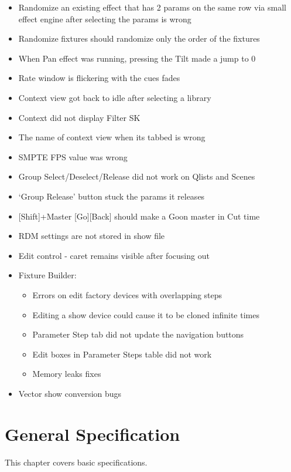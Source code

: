 \documentclass[
]{article}
\begin{document}
\begin{itemize}
\item
  Randomize an existing effect that has 2 params on the same row via small effect engine after selecting the params is wrong
\item
  Randomize fixtures should randomize only the order of the fixtures
\item
  When Pan effect was running, pressing the Tilt made a jump to 0
\item
  Rate window is flickering with the cues fades
\item
  Context view got back to idle after selecting a library
\item
  Context did not display Filter SK
\item
  The name of context view when its tabbed is wrong
\item
  SMPTE FPS value was wrong
\item
  Group Select/Deselect/Release did not work on Qlists and Scenes
\item
  `Group Release' button stuck the params it releases
\item
  {[}Shift{]}+Master {[}Go{]}{[}Back{]} should make a Go\Back on master in Cut time
\item
  RDM settings are not stored in show file
\item
  Edit control - caret remains visible after focusing out
\item
  Fixture Builder:

  \begin{itemize}
  \item
    Errors on edit factory devices with overlapping steps
  \item
    Editing a show device could cause it to be cloned infinite times
  \item
    Parameter Step tab did not update the navigation buttons
  \item
    Edit boxes in Parameter Steps table did not work
  \item
    Memory leaks fixes
  \end{itemize}
\item
  Vector show conversion bugs
\end{itemize}

\hypertarget{general-specification}{%
\section{General Specification}\label{general-specification}}

This chapter covers basic specifications.
\end{document}
